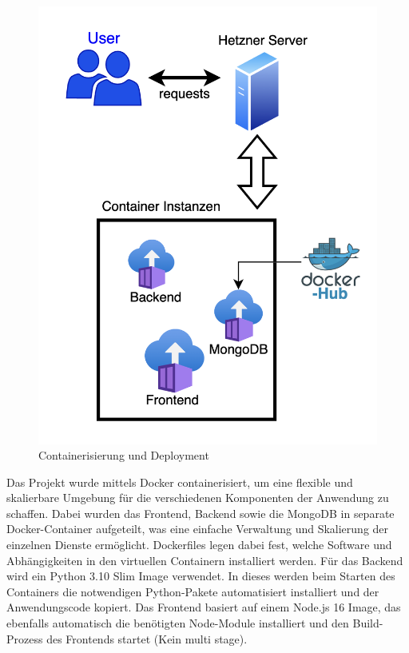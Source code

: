 \documentclass[conference,a4paper,flushend]{cs-techrep}
\begin{document}
\begin{figure}[h]
	\centering
	\includegraphics[width=\linewidth]{../Bilder/Deployment.png}
	\caption{Containerisierung und Deployment}
	\label{fig:Deployment}
\end{figure}

Das Projekt wurde mittels Docker containerisiert, um eine flexible und skalierbare Umgebung für die verschiedenen Komponenten der Anwendung zu schaffen.
Dabei wurden das Frontend, Backend sowie die MongoDB in separate Docker-Container aufgeteilt, was eine einfache Verwaltung und Skalierung der einzelnen Dienste ermöglicht. Dockerfiles legen dabei fest, welche Software und Abhängigkeiten in den virtuellen Containern installiert werden. Für das Backend wird ein Python 3.10 Slim Image verwendet. In dieses werden beim Starten des Containers die notwendigen Python-Pakete automatisiert installiert und der Anwendungscode kopiert. Das Frontend basiert auf einem Node.js 16 Image, das ebenfalls automatisch die benötigten Node-Module installiert und den Build-Prozess des Frontends startet (Kein multi stage).
\end{document}

